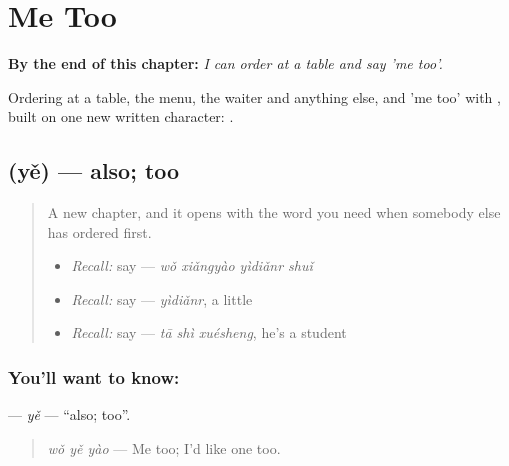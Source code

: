 
\chapter{Me Too}
\label{ch:zh-me-too}

\begin{chapteropening}
\textbf{By the end of this chapter:} \emph{I can order at a table and say 'me too'.}

Ordering at a table, the menu, the waiter and anything else, and 'me too' with , built on one new written character: .
\end{chapteropening}

\section[\texorpdfstring{\zh{也} (yě)}{也 (yě)}]{ (yě) — also; too}

\label{lesson:ZH-C92-ye}



\begin{quote}
A new chapter, and it opens with the word you need when somebody else has ordered first.

\begin{itemize}
\raggedright
  \item \emph{Recall:} say  — \emph{wǒ xiǎngyào yìdiǎnr shuǐ}
  \item \emph{Recall:} say  — \emph{yìdiǎnr}, a little
  \item \emph{Recall:} say  — \emph{tā shì xuésheng}, he's a student
\end{itemize}
\end{quote}

\subsection*{You'll want to know: }
\textbf{} — \emph{yě} — \textquotedblleft{}also; too\textquotedblright{}.

\begin{quote}
\textbf{} \emph{wǒ yě yào} — Me too; I'd like one too.
\end{quote}

